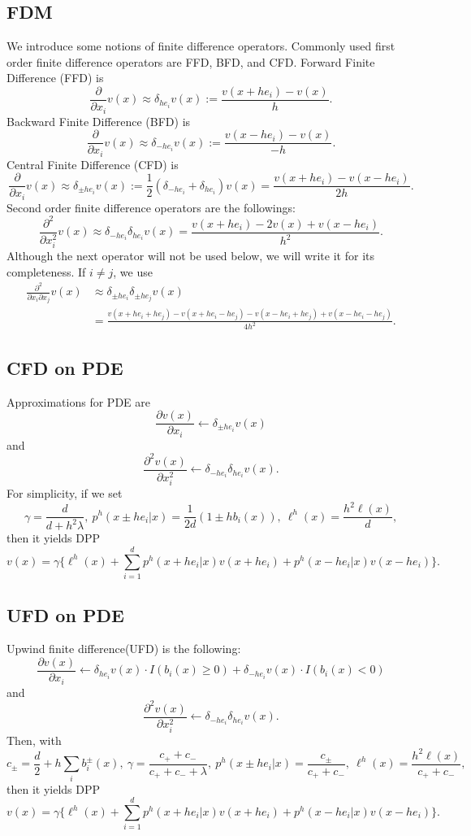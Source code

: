 \documentclass[11pt]{amsart}
\begin{document}
\subsection{FDM}
We introduce some notions of finite difference operators.
Commonly used first order finite difference operators 
are FFD, BFD, and CFD. 
Forward Finite Difference (FFD) is
$$\frac{\partial}{\partial x_{i}}v(x) \approx \delta_{he_{i}} v(x) 
:= \frac{v(x+he_{i}) - v(x)}{h}.$$
Backward Finite Difference (BFD) is
$$\frac{\partial}{\partial x_{i}}v(x) \approx \delta_{-he_{i}} v(x) 
:= \frac{v(x-he_{i}) - v(x)}{-h}.$$
Central Finite Difference (CFD) is
$$\frac{\partial}{\partial x_{i}}v(x) \approx 
\delta_{\pm h e_{i}} v(x)
:= \frac 1 2 (\delta_{-he_{i}} + \delta_{he_{i}}) v(x)
= \frac{v(x+he_{i}) - v(x-he_{i})}{2h}.$$
Second order finite difference operators are the followings:
$$
\frac{\partial^{2}}{\partial x_{i}^{2}} v(x)
\approx
\delta_{-he_{i}} \delta_{he_{i}} v(x)
= \frac{v(x+he_{i}) - 2 v(x) + v(x- he_{i})}{h^{2}}.
$$
Although the next operator will not be used below, we will write it for its completeness. If $i \neq j$, we use
$$
\begin{array}
 {ll}
\frac{\partial^{2}}{\partial x_{i} \partial x_{j}} v(x) &\approx
\delta_{\pm he_{i}} \delta_{\pm he_{j}} v(x)
\\ 
& \displaystyle
= \frac{v(x+he_{i}+he_{j}) - v(x+he_{i}-he_{j})
- v(x-he_{i}+he_{j})+ v(x-he_{i}-he_{j})}{4h^{2}}. 
\end{array}
$$


\subsection{CFD on PDE}
Approximations for PDE are 
$$
\frac{\partial v(x)}{\partial x_i} \leftarrow 
\delta_{\pm h e_{i}} v(x)
$$
and
$$
\frac{\partial^2 v(x)}{\partial x_i^2} \leftarrow
\delta_{-he_{i}} \delta_{he_{i}} v(x).$$
For simplicity, if we set 
$$
\gamma = \frac{d}{d+ h^{2} \lambda}, \
p^{h}(x \pm he_{i}|x) = \frac 1 {2d} (1\pm h b_{i}(x)), \
\ell^{h}(x) = \frac{h^{2} \ell(x)}{d},
$$
then it yields DPP
$$
v (x) = \gamma 
\Big\{ \ell^{h}(x) + 
\sum_{i=1}^{d} 
p^{h}(x+he_{i}|x) v(x+he_{i})
+ p^{h}(x-he_{i}|x) v(x-he_{i})
\Big\}.
$$

\subsection{UFD on PDE}
Upwind finite difference(UFD) is the following:
$$
\frac{\partial v(x)}{\partial x_i} \leftarrow 
\delta_{ h e_{i}} v(x) \cdot I(b_{i}(x)\ge 0) +
\delta_{-he_{i}} v(x) \cdot I(b_{i}(x) <0)
$$
and
$$
\frac{\partial^2 v(x)}{\partial x_i^2} \leftarrow
\delta_{-he_{i}} \delta_{he_{i}} v(x).$$
Then, with
$$
c_{\pm} = \frac d 2 + h \sum_{i} b^{\pm}_{i}(x), \ 
\gamma = \frac{c_{+}+c_{-}}{c_{+}+c_{-}+ \lambda}, \
p^{h}(x \pm he_{i}|x) = \frac{c_{\pm}}{c_{+}+c_{-}}, \
\ell^{h}(x) = \frac{h^{2} \ell(x)}{c_{+}+c_{-}},
$$
then it yields DPP
$$
v (x) = \gamma 
\Big\{ \ell^{h}(x) + 
\sum_{i=1}^{d} 
p^{h}(x+he_{i}|x) v(x+he_{i})
+ p^{h}(x-he_{i}|x) v(x-he_{i})
\Big\}.
$$
\end{document}
